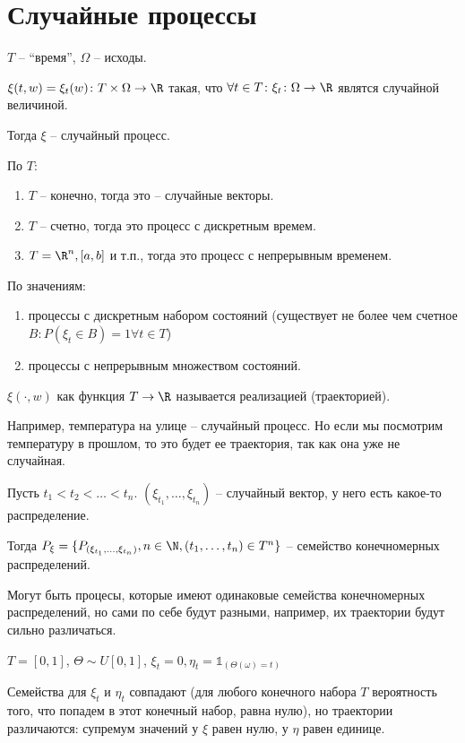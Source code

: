 \chapter{Случайные процессы}
\begin{Def}
$T$ -- ``время'', $\Omega$ -- исходы.

$\xi(t, w) = \xi_t(w) \colon T \times \Omega \to \R$ такая, что $\forall t \in T\colon \xi_t \colon \Omega \to \R$ являтся случайной величиной.

Тогда $\xi$ -- случайный процесс.

По $T$:
\begin{enumerate}
\item $T$ -- конечно, тогда это -- случайные векторы.
\item $T$ -- счетно, тогда это процесс с дискретным времем.
\item $T = \R^n, [a, b]$ и т.п., тогда это процесс с непрерывным временем.
\end{enumerate}

По значениям: 
\begin{enumerate}
\item процессы с дискретным набором состояний (существует не более чем счетное $B \colon P(\xi_t \in B) = 1 \forall t \in T$) 
\item процессы с непрерывным множеством состояний.
\end{enumerate}

$\xi (\cdot, w)$ как функция $T \to \R$ называется реализацией (траекторией). 
\end{Def}
\begin{exmp}
Например, температура на улице -- случайный процесс. 
Но если мы посмотрим температуру в прошлом, то это будет ее траектория, так как она уже не случайная.
\end{exmp}

\begin{Def}
Пусть $t_1 < t_2 < \dots < t_n$. $(\xi_{t_1}, \dots, \xi_{t_n})$ -- случайный вектор, у него есть какое-то распределение.

Тогда  $P_\xi = \{ P_{(\xi_{t_1}, \dots, \xi_{t_n})}, n \in \N, (t_1, \dots, t_n) \in T^n \}$ -- семейство конечномерных распределений.
\end{Def}
\begin{exmp}
Могут быть процесы, которые имеют одинаковые семейства конечномерных распределений, но сами по себе будут разными, например, их траектории будут сильно различаться.

$T = [0, 1]$, $\Theta \sim U[0, 1]$, $\xi_t = 0, \eta_t = \mathbb{1}_{(\Theta(\omega) = t)}$

Семейства для $\xi_t$ и $\eta_t$ совпадают (для любого конечного набора $T$ вероятность того, что попадем в этот конечный набор, равна нулю), 
но траектории различаются: супремум значений у $\xi$ равен нулю, у $\eta$ равен единице.
\end{exmp}

